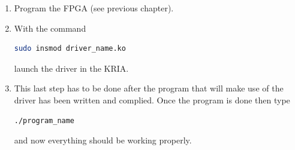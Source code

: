\begin{enumerate}
	\item Program the FPGA (see previous chapter).
	
	\item With the command 
	\vspace{0.1cm}
	\begin{lstlisting}[language=bash]
		sudo insmod driver_name.ko	\end{lstlisting}
	launch the driver in the KRIA. 
	
	\item This last step has to be done after the program that will make use of the driver has been written and complied. Once the program is done then type
	\vspace{0.1cm}
	\begin{lstlisting}[language=bash]
		./program_name	\end{lstlisting}
	and now everything should be working properly.
\end{enumerate}
